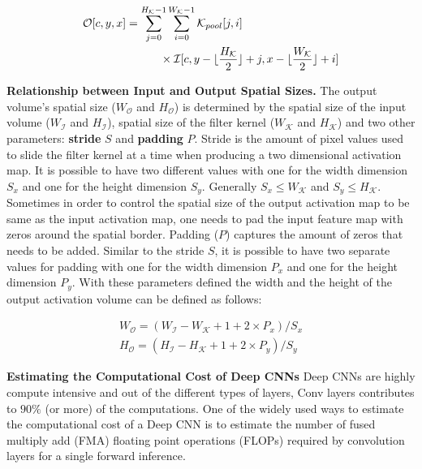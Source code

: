 \begin{equation}
\label{eqn:pool_operator}
\begin{split}
\mathcal{O}[c,y,x] &= \sum_{j=0}^{H_\mathcal{K}-1} \sum_{i=0}^{W_\mathcal{K}-1} \mathcal{K}_{pool}[j, i] \\ & \quad \quad \quad \times \mathcal{I}[c,y-\lfloor\frac{H_\mathcal{K}}{2}\rfloor+j,x-\lfloor\frac{W_\mathcal{K}}{2}\rfloor+i]
\end{split}
\end{equation}


\vspace{2mm}
\noindent \textbf{Relationship between Input and Output Spatial Sizes.} The output volume's spatial size ($W_{\mathcal{O}}$ and $H_{\mathcal{O}}$) is determined by the spatial size of the input volume ($W_{\mathcal{I}}$ and $H_{\mathcal{I}}$), spatial size of the filter kernel ($W_\mathcal{K}$ and $H_\mathcal{K}$) and two other parameters: \textbf{stride} $S$ and \textbf{padding} $P$. Stride is the amount of pixel values used to slide the filter kernel at a time when producing a two dimensional activation map. It is possible to have two different values with one for the width dimension $S_x$ and one for the height dimension $S_y$. Generally $S_x \leq W_\mathcal{K}$ and $S_y \leq H_\mathcal{K}$. Sometimes in order to control the spatial size of the output activation map to be same as the input activation map, one needs to pad the input feature map with zeros around the spatial border. Padding ($P$) captures the amount of zeros that needs to be added. Similar to the stride $S$, it is possible to have two separate values for padding with one for the width dimension $P_x$ and one for the height dimension $P_y$. With these parameters defined the width and the height of the output activation volume can be defined as follows:

\begin{align}
W_{\mathcal{O}} = (W_{\mathcal{I}} - W_\mathcal{K} + 1 + 2\times P_x)/S_x \\
H_{\mathcal{O}} = (H_{\mathcal{I}} - H_\mathcal{K} + 1 + 2\times P_y)/S_y
\end{align}

\vspace{2mm}
\noindent \textbf{Estimating the Computational Cost of Deep CNNs}
Deep CNNs are highly compute intensive and out of the different types of layers, Conv layers contributes to $90\%$ (or more) of the computations. One of the widely used ways to estimate the computational cost of a Deep CNN is to estimate the number of fused multiply add (FMA) floating point operations (FLOPs) required by convolution layers for a single forward inference.

